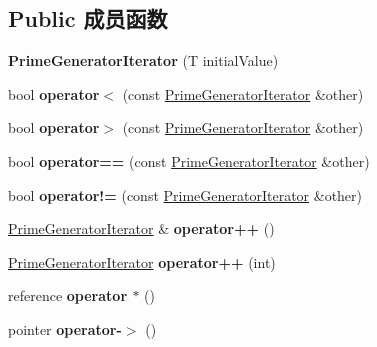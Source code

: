 \subsection*{Public 成员函数}
\begin{DoxyCompactItemize}
\item 
\mbox{\label{class_prime_generator_iterator_af6b4c99790d63d6e57a53b89af31c2ff}} 
{\bfseries Prime\+Generator\+Iterator} (T initial\+Value)
\item 
\mbox{\label{class_prime_generator_iterator_aca8de381cb3230a99083f5e0b916fb81}} 
bool {\bfseries operator$<$} (const \mbox{\hyperlink{class_prime_generator_iterator}{Prime\+Generator\+Iterator}} \&other)
\item 
\mbox{\label{class_prime_generator_iterator_a9debbdc979ac89c0d063e5ca3a818440}} 
bool {\bfseries operator$>$} (const \mbox{\hyperlink{class_prime_generator_iterator}{Prime\+Generator\+Iterator}} \&other)
\item 
\mbox{\label{class_prime_generator_iterator_ab8616c7addb015e88804f7c38758d5e0}} 
bool {\bfseries operator==} (const \mbox{\hyperlink{class_prime_generator_iterator}{Prime\+Generator\+Iterator}} \&other)
\item 
\mbox{\label{class_prime_generator_iterator_a84c44b4c104343d375778cfe1f45da51}} 
bool {\bfseries operator!=} (const \mbox{\hyperlink{class_prime_generator_iterator}{Prime\+Generator\+Iterator}} \&other)
\item 
\mbox{\label{class_prime_generator_iterator_a95fb26c8e33dddef3d86de9bc3bc63b2}} 
\mbox{\hyperlink{class_prime_generator_iterator}{Prime\+Generator\+Iterator}} \& {\bfseries operator++} ()
\item 
\mbox{\label{class_prime_generator_iterator_a1085cd8d291b7e82455f2e18c9dbf86a}} 
\mbox{\hyperlink{class_prime_generator_iterator}{Prime\+Generator\+Iterator}} {\bfseries operator++} (int)
\item 
\mbox{\label{class_prime_generator_iterator_ac79bab89586d01d7799b3f816401c718}} 
reference {\bfseries operator $\ast$} ()
\item 
\mbox{\label{class_prime_generator_iterator_af9bd2639a93ce5981b882b11c637cfe0}} 
pointer {\bfseries operator-\/$>$} ()
\end{DoxyCompactItemize}


